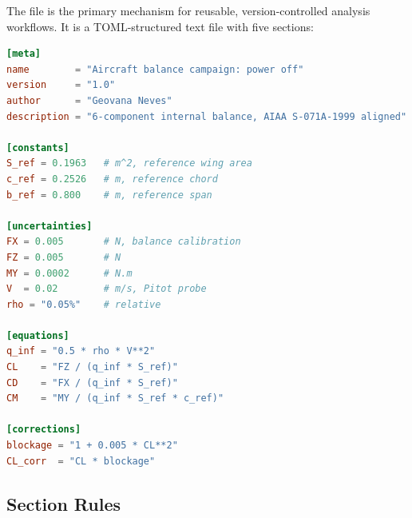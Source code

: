 The  file is the primary mechanism for reusable,
version-controlled analysis workflows. It is a TOML-structured text file
with five sections:

\begin{lstlisting}[language=toml]
[meta]
name        = "Aircraft balance campaign: power off"
version     = "1.0"
author      = "Geovana Neves"
description = "6-component internal balance, AIAA S-071A-1999 aligned"

[constants]
S_ref = 0.1963   # m^2, reference wing area
c_ref = 0.2526   # m, reference chord
b_ref = 0.800    # m, reference span

[uncertainties]
FX = 0.005       # N, balance calibration
FZ = 0.005       # N
MY = 0.0002      # N.m
V  = 0.02        # m/s, Pitot probe
rho = "0.05%"    # relative

[equations]
q_inf = "0.5 * rho * V**2"
CL    = "FZ / (q_inf * S_ref)"
CD    = "FX / (q_inf * S_ref)"
CM    = "MY / (q_inf * S_ref * c_ref)"

[corrections]
blockage = "1 + 0.005 * CL**2"
CL_corr  = "CL * blockage"
\end{lstlisting}

\subsection{Section Rules}

